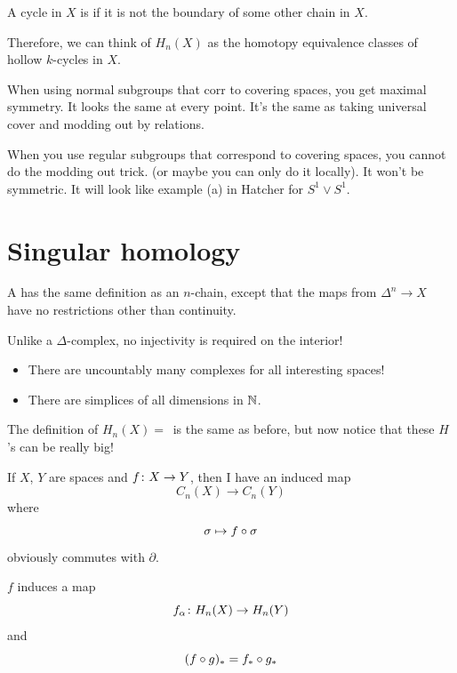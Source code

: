 \documentclass[11pt,leqno,oneside]{amsart}
\newenvironment{dateenv}{
  \vspace{1em}
}{
  \vspace{1em}
}
\newcommand{\mydate}[4]{
  \newdate{#1}{#2}{#3}{#4}
  \begin{dateenv}
    \hfill\displaydate{#1}
  \end{dateenv}
}
\numberwithin{thm}{section}
\renewcommand{\d}{\partial}
\newcommand{\homl}[1][n]{H_{#1}}
\begin{document}
\begin{thm}
  A cycle in $X$ is  if it is not the boundary of some other chain in $X$.
\end{thm}
\begin{rmk}
  Therefore, we can think of $\homl(X)$ as the homotopy equivalence classes of hollow $k$-cycles in $X$.
\end{rmk}




\mydate{d15}{1}{3}{2017}

\mydate{d16}{3}{3}{2017}

When using normal subgroups that corr to covering spaces, you get
maximal symmetry. It looks the same at every point. It's the same as
taking universal cover and modding out by relations.

When you use regular subgroups that correspond to covering spaces, you cannot
do the modding out trick.  (or maybe you can only do it locally).  It
won't be symmetric.  It will look like example (a) in Hatcher for $S^1 \vee
S^1$.


\section*{Singular homology}

\begin{defn}
  A  has the same definition as an $n$-chain, except that the maps from $\Delta^n \to X$ have no restrictions other than continuity.
\end{defn}
\begin{rmk}
  Unlike a $\Delta$-complex, no injectivity is required on the interior!
  \begin{itemize}
    \item There are uncountably many complexes for all interesting spaces!
    \item There are simplices of all dimensions in ${\mathbb N}$.
  \end{itemize}
\end{rmk}


The definition of  $\homl(X) = \frac{}{}$ is the same as before, but now notice that these $H$'s can be really big!

If $X$, $Y$ are spaces and $f \colon X \to Y$, then I have an induced map $$C_n(X) \to C_n(Y)$$ where $$ \sigma \mapsto f \circ \sigma$$ obviously commutes with $\d$.

\begin{thm}
  $f$ induces a map $$f_\alpha \from \homl(X) \to \homl(Y)$$ and $$(f \circ g)_\ast = f_\ast \circ g_\ast$$
\end{thm}
\end{document}
